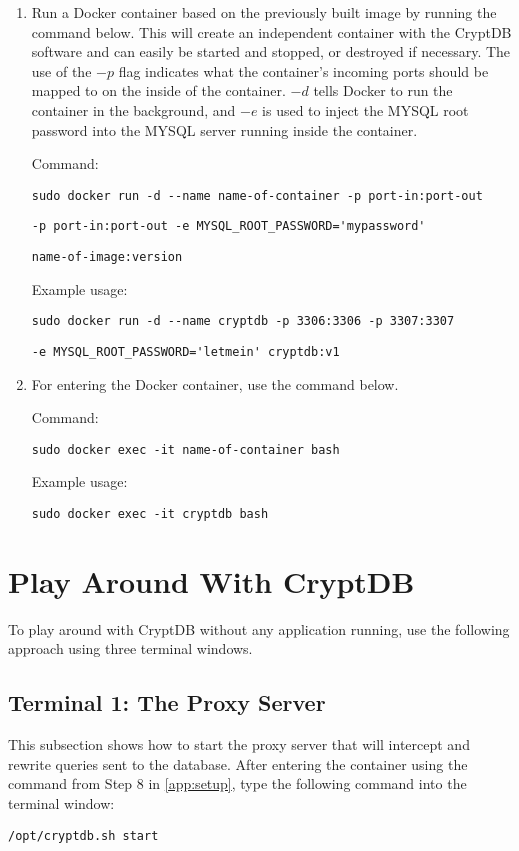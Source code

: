 \begin{enumerate}
\item Run a Docker container based on the previously built image by running the command below. This will create an independent container with the CryptDB software and can easily be started and stopped, or destroyed if necessary. The use of the $-p$ flag indicates what the container's incoming ports should be mapped to on the inside of the container. $-d$ tells Docker to run the container in the background, and $-e$ is used to inject the MYSQL root password into the MYSQL server running inside the container.

Command:

\verb!sudo docker run -d --name name-of-container -p port-in:port-out!

\verb!-p port-in:port-out -e MYSQL_ROOT_PASSWORD='mypassword'!

\verb!name-of-image:version!

Example usage:

\verb!sudo docker run -d --name cryptdb -p 3306:3306 -p 3307:3307!

\verb!-e MYSQL_ROOT_PASSWORD='letmein' cryptdb:v1!

\item For entering the Docker container, use the command below.

Command:

\verb!sudo docker exec -it name-of-container bash!

Example usage:

\verb!sudo docker exec -it cryptdb bash!

\end{enumerate}


\section{Play Around With CryptDB}
\label{app:playaround}
To play around with CryptDB without any application running, use the following approach using three terminal windows.

\subsection{Terminal 1: The Proxy Server}
This subsection shows how to start the proxy server that will intercept and rewrite queries sent to the database. After entering the container using the command from Step 8 in \ref{app:setup}, type the following command into the terminal window:

\verb!/opt/cryptdb.sh start!

